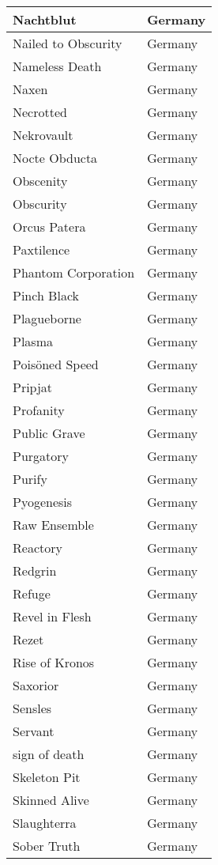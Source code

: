 \documentclass[12pt, a4paper, twoside]{report}
\begin{document}
\begin{center}
\begin{longtable}{|p{5cm}|p{5cm}|}
Nachtblut & Germany \\ \hline
Nailed to Obscurity & Germany \\ \hline
Nameless Death & Germany \\ \hline
Naxen & Germany \\ \hline
Necrotted & Germany \\ \hline
Nekrovault & Germany \\ \hline
Nocte Obducta & Germany \\ \hline
Obscenity & Germany \\ \hline
Obscurity & Germany \\ \hline
Orcus Patera & Germany \\ \hline
Paxtilence & Germany \\ \hline
Phantom Corporation & Germany \\ \hline
Pinch Black & Germany \\ \hline
Plagueborne & Germany \\ \hline
Plasma & Germany \\ \hline
Poisöned Speed & Germany \\ \hline
Pripjat & Germany \\ \hline
Profanity & Germany \\ \hline
Public Grave & Germany \\ \hline
Purgatory & Germany \\ \hline
Purify & Germany \\ \hline
Pyogenesis & Germany \\ \hline
Raw Ensemble & Germany \\ \hline
Reactory & Germany \\ \hline
Redgrin & Germany \\ \hline
Refuge & Germany \\ \hline
Revel in Flesh & Germany \\ \hline
Rezet & Germany \\ \hline
Rise of Kronos & Germany \\ \hline
Saxorior & Germany \\ \hline
Sensles & Germany \\ \hline
Servant & Germany \\ \hline
sign of death & Germany \\ \hline
Skeleton Pit & Germany \\ \hline
Skinned Alive & Germany \\ \hline
Slaughterra & Germany \\ \hline
Sober Truth & Germany \\ \hline

\end{longtable}
\end{center}
\end{document}
